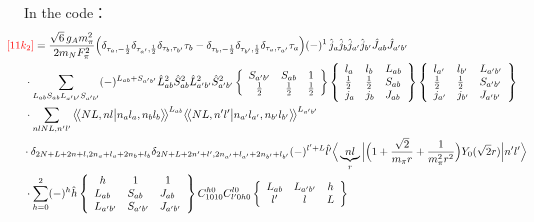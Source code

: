 \documentclass[master]{shnuthesis}
\newcommand{\llangle}{\big\langle\!\big\langle}
\newcommand{\rrangle}{\big\rangle\!\big\rangle}
\newcommand{\ap}{a^\prime}
\newcommand{\bp}{b^\prime}
\newcommand{\il}{\!\!\!\!\!\!\!\!\!\!}
\begin{document}
In the code：
\begin{align}
    &\il {\color{red} [11k_2]} = \frac{\sqrt{6}\, g_A m_\pi^2}{2m_N F_\pi^2} \Big( \delta_{\tau_a,-\frac{1}{2}}\delta_{\tau_{\ap},\frac{1}{2}}\delta_{\tau_b,\tau_{\bp}}\tau_b - \delta_{\tau_b,-\frac{1}{2}}\delta_{\tau_{\bp},\frac{1}{2}}\delta_{\tau_a,\tau_{\ap}}\tau_a \Big) (-)^{1} \,\hat{j}_a\hat{j}_b\hat{j}_{\ap}\hat{j}_{\bp} \hat{J}_{ab}\hat{J}_{\ap\bp}  \notag \\
    & \cdot \sum_{L_{ab}S_{ab}L_{\ap\bp}S_{\ap\bp}} (-)^{L_{ab}+S_{\ap\bp}} \hat{L}_{ab}^2\hat{S}_{ab}^2\hat{L}_{\ap\bp}^2\hat{S}_{\ap\bp}^2  \left\{\begin{array}{ccc} S_{\ap\bp} & S_{ab} & 1 \\ \frac{1}{2} & \frac{1}{2} & \frac{1}{2} \end{array}\right\}  \left\{\begin{array}{lll}l_{a} & l_{b} & L_{ab} \\ \frac{1}{2} & \frac{1}{2} & S_{ab} \\j_{a} & j_{b} & J_{ab} \end{array}\right\} \left\{\begin{array}{lll}l_{\ap} & l_{\bp} & L_{\ap\bp} \\ \frac{1}{2} & \frac{1}{2} & S_{\ap\bp} \\j_{\ap} & j_{\bp} & J_{\ap\bp} \end{array}\right\}  \notag\\
    & \cdot \sum_{nlNL,n^\prime l^\prime} \llangle N L, n l \big| n_{a} l_{a}, n_{b} l_{b} \rrangle^{L_{ab}} \llangle N L, n^\prime l^\prime \big| n_{a^\prime} l_{a^\prime}, n_{b^\prime} l_{b^\prime} \rrangle^{L_{\ap\bp}} \notag\\
    &\! \cdot \delta_{2N+L+2n+l,2n_a+l_a+2n_b+l_b}\delta_{2N+L+2n^\prime+l^\prime,2n_{a^\prime}+l_{a^\prime}+2n_{b^\prime}+l_{b^\prime}} (-)^{l^\prime+L}\hat{l^\prime} \Big\langle \underbrace{n l}_{r} \Big| \Big(1+\frac{\sqrt{2}}{m_\pi r}+\frac{1}{m_\pi^2 r^2}\Big) Y_0(\sqrt{2}r) \Big| n^\prime l^\prime \Big\rangle  \notag\\
    & \cdot \sum_{h=0}^{2} (-)^{h}\hat{h} \left\{\begin{array}{lll} \,\,\,h & \,\,\,1 & \,\,\,1 \\ L_{ab} & S_{ab} & J_{ab} \\ L_{\ap\bp} & S_{\ap\bp} & J_{\ap\bp} \end{array}\right\}  C_{1010}^{h0}C_{l^\prime 0 h 0}^{l0}  \left\{\begin{array}{ccc} L_{ab} & L_{\ap\bp} & h \\ l^\prime & l & L \end{array}\right\}
\end{align}
\end{document}
